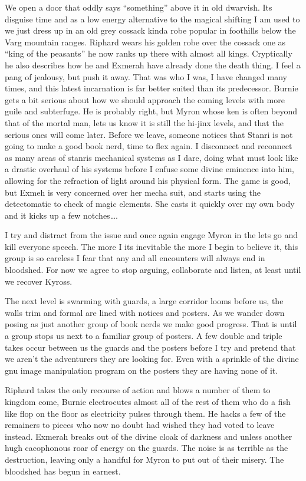 We open a door that oddly says “something” above it in old dwarvish. Its disguise time and as a low energy alternative to the magical shifting I am used to we just dress up in an old grey cossack kinda robe popular in foothills below the Varg mountain ranges. Riphard wears his golden robe over the cossack one as “king of the peasants” he now ranks up there with almost all kings. Cryptically he also describes how he and Exmerah have already done the death thing. I feel a pang of jealousy, but push it away. That was who I was, I have changed many times, and this latest incarnation is far better suited than its predecessor. Burnie gets a bit serious about how we should approach the coming levels with more guile and subterfuge. He is probably right, but Myron whose ken is often beyond that of the mortal man, lets us know it is still the hi-jinx levels, and that the serious ones will come later. Before we leave, someone notices that Stanri is not going to make a good book nerd, time to flex again. I disconnect and reconnect as many areas of stanris mechanical systems as I dare, doing what must look like a drastic overhaul of his systems before I enfuse some divine eminence into him, allowing for the refraction of light around his physical form. The game is good, but Exmeh is very concerned over her mecha suit, and starts using the detectomatic to check of magic elements. She casts it quickly over my own body and it kicks up a few notches….\medskip

I try and distract from the issue and once again engage Myron in the lets go and kill everyone speech. The more I its inevitable the more I begin to believe it, this group is so careless I fear that any and all encounters will always end in bloodshed. For now we agree to stop arguing, collaborate and listen, at least until we recover Kyross.\medskip

The next level is swarming with guards, a large corridor looms before us, the walls trim and formal are lined with notices and posters. As we wander down posing as just another group of book nerds we make good progress. That is until a group stops us next to a familiar group of posters. A few double and triple takes occur between us the guards and the posters before I try and pretend that we aren’t the adventurers they are looking for. Even with a sprinkle of the divine gnu image manipulation program on the posters they are having none of it.\medskip

Riphard takes the only recourse of action and blows a number of them to kingdom come, Burnie electrocutes almost all of the rest of them who do a fish like flop on the floor as electricity pulses through them. He hacks a few of the remainers to pieces who now no doubt had wished they had voted to leave instead. Exmerah breaks out of the divine cloak of darkness and unless another hugh cacophonous roar of energy on the guards. The noise is as terrible as the destruction, leaving only a handful for Myron to put out of their misery. The bloodshed has begun in earnest.\medskip

